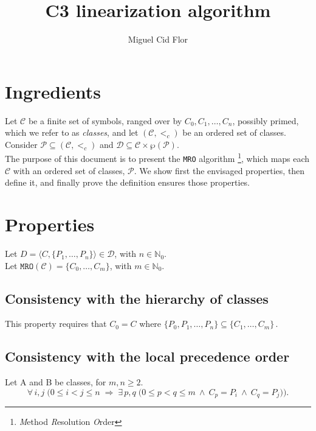 \documentclass{article}
\title{C3 linearization algorithm}
\author{Miguel Cid Flor}
\newcommand*{\CC}{\ensuremath{\mathcal{C}}\xspace}
\newcommand*{\DD}{\ensuremath{\mathcal{D}}\xspace}
\newcommand*{\ordCC}{\ensuremath{(\mathcal{C}, <_c)}\xspace}
\newcommand*{\mro}{\texttt{MRO}}
\newcommand*{\natz}{\ensuremath{\mathbb{N}_0}}
\begin{document}
\maketitle

\section*{Ingredients}

Let \CC be a finite set of symbols, ranged over by \( C_0, C_1, \ldots, C_n \), possibly primed, which we refer to as \emph{classes}, and let \ordCC be an ordered set of classes. %
Consider $\mathcal P \subseteq \ordCC$ and $\DD \subseteq \CC \times \wp{(\mathcal P)}$.\\

The purpose of this document is to present the \texttt{MRO} algorithm%
\footnote{\emph{M}ethod \emph{R}esolution \emph{O}rder},
which maps each $\CC$ with an ordered set of classes, $\mathcal P$. We show first the envisaged properties, then define it, and finally prove the definition ensures those properties.


\section*{Properties}

Let $D = \langle C, \{P_1, \dots, P_n\} \rangle \in \DD$, with $n\in\natz$.\\
Let $\mro(\CC) = \{C_0, \dots, C_m\}$, with $m \in \natz$.\\
\subsection*{Consistency with the hierarchy of classes} 
This property requires that $C_0 = C$ where
\(
\{P_0, P_1, \dots, P_n\} \subseteq \{C_1, \dots, C_m\}\,.
\)

\subsection*{Consistency with the local precedence order}
Let A and B be classes, for $m,n \geq 2$.\\
\[
\forall\,i,j\;\bigl(0\le i<j\le n
\;\Longrightarrow\;
\exists\,p,q\;\bigl(0\le p<q\le m \ \wedge \ C_p=P_i \ \wedge \ C_q=P_j\bigr)\bigr).
\]
\end{document}
